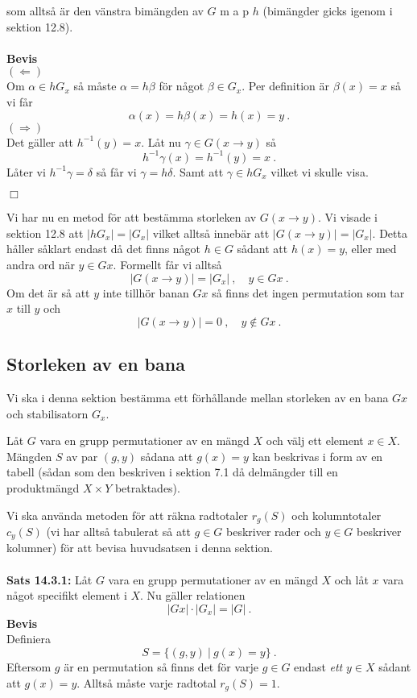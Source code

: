 \documentclass{article}
\begin{document}
som alltså är den vänstra bimängden av $G$ m a p $h$ (bimängder gicks igenom i sektion 12.8).
\\ \\
\textbf{Bevis}
\\
$(\Leftarrow)$
\\
Om $\alpha\in hG_x$ så måste $\alpha=h\beta$ för något $\beta\in G_x$. Per definition är $\beta(x)=x$ så vi får
$$
\alpha(x)=h\beta(x)=h(x)=y \ .
$$
$(\Rightarrow)$
\\
Det gäller att $h^{-1}(y)=x$. Låt nu $\gamma\in G(x\rightarrow y)$ så
$$
h^{-1}\gamma(x)=h^{-1}(y)=x \ .
$$
Låter vi $h^{-1}\gamma=\delta$ så får vi $\gamma=h\delta$. Samt att $\gamma\in hG_x$ vilket vi skulle visa.
\begin{flushright}
$\Box$
\end{flushright}
Vi har nu en metod för att bestämma storleken av $G(x\rightarrow y)$. Vi visade i sektion 12.8 att $|hG_x|=|G_x|$ vilket alltså innebär att $|G(x\rightarrow y)|=|G_x|$. Detta håller såklart endast då det finns något $h\in G$ sådant att $h(x)=y$, eller med andra ord när $y\in Gx$. Formellt får vi alltså
$$
|G(x\rightarrow y)|=|G_x| \ , \quad y\in Gx \ .
$$
Om det är så att $y$ inte tillhör banan $Gx$ så finns det ingen permutation som tar $x$ till $y$ och
$$
|G(x\rightarrow y)|=0 \ , \quad y\notin Gx \ .
$$
\subsection{Storleken av en bana}
Vi ska i denna sektion bestämma ett förhållande mellan storleken av en bana $Gx$ och stabilisatorn $G_x$.

Låt $G$ vara en grupp permutationer av en mängd $X$ och välj ett element $x\in X$. Mängden $S$ av par $(g,y)$ sådana att $g(x)=y$ kan beskrivas i form av en tabell (sådan som den beskriven i sektion 7.1 då delmängder till en produktmängd $X\times Y$ betraktades).

Vi ska använda metoden för att räkna radtotaler $r_g(S)$ och kolumntotaler $c_y(S)$ (vi har alltså tabulerat så att $g\in G$ beskriver rader och $y\in G$ beskriver kolumner) för att bevisa huvudsatsen i denna sektion.
\\ \\
\textbf{Sats 14.3.1:} Låt $G$ vara en grupp permutationer av en mängd $X$ och låt $x$ vara något specifikt element i $X$. Nu gäller relationen 
$$
|Gx|\cdot|G_x|=|G| \ .
$$
\textbf{Bevis}
\\
Definiera
$$
S=\{(g,y) \ | \ g(x)=y\} \ .
$$
Eftersom $g$ är en permutation så finns det för varje $g\in G$ endast \textit{ett} $y\in X$ sådant att $g(x)=y$. Alltså måste varje radtotal $r_{g}(S)=1$.
\end{document}
